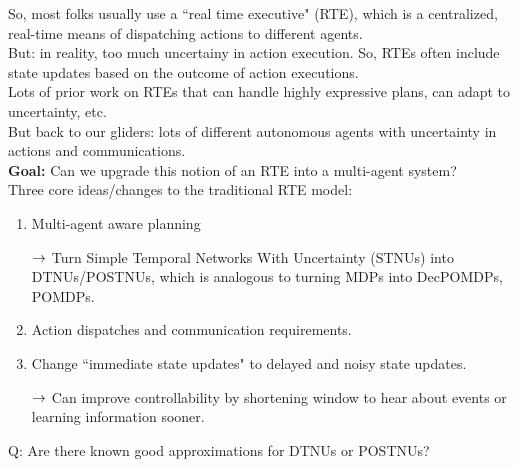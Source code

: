 So, most folks usually use a ``real time executive" (RTE), which is a centralized, real-time means of dispatching actions to different agents. \\

But: in reality, too much uncertainy in action execution. So, RTEs often include state updates based on the outcome of action executions. \\

Lots of prior work on RTEs that can handle highly expressive plans, can adapt to uncertainty, etc. \\

But back to our gliders: lots of different autonomous agents with uncertainty in actions and communications. \\

{\bf Goal:} Can we upgrade this notion of an RTE into a multi-agent system? \\

Three core ideas/changes to the traditional RTE model:
\begin{enumerate}
    \item Multi-agent aware planning
    
    $\rightarrow$ Turn Simple Temporal Networks With Uncertainty (STNUs) into DTNUs/POSTNUs, which is analogous to turning MDPs into DecPOMDPs, POMDPs.
    
    \item Action dispatches and communication requirements.
    
    \item Change ``immediate state updates" to delayed and noisy state updates.
    
    $\rightarrow$ Can improve controllability by shortening window to hear about events or learning information sooner.
\end{enumerate}

Q: Are there known good approximations for DTNUs or POSTNUs?